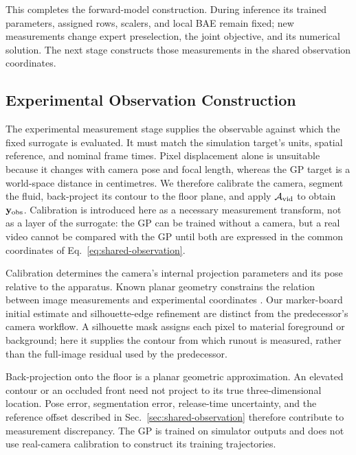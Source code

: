 This completes the forward-model construction. During inference its
trained parameters, assigned rows, scalers, and local BAE remain fixed;
new measurements change expert preselection, the joint objective, and
its numerical solution. The next stage
constructs those measurements in the shared observation coordinates.

\FloatBarrier
\subsection{Experimental Observation Construction}

\label{sec:calib}
\label{sec:obs-pipeline}


The experimental measurement stage supplies the observable against
which the fixed surrogate is evaluated. It must match the simulation
target's units, spatial reference, and nominal frame times.  Pixel displacement alone is unsuitable because it
changes with camera pose and focal length, whereas the GP target is a
world-space distance in centimetres.  We therefore calibrate the camera,
segment the fluid, back-project its contour to the floor plane, and apply
$\mathcal{A}_{\rm vid}$ to obtain $\mathbf{y}_{\rm obs}$.  Calibration is
introduced here as a necessary measurement transform, not as a layer of
the surrogate: the GP can be trained without a camera, but a real video
cannot be compared with the GP until both are expressed in the common
coordinates of Eq.~\eqref{eq:shared-observation}.


Calibration determines the camera's internal projection parameters and
its pose relative to the apparatus. Known planar geometry constrains
the relation between image measurements and experimental coordinates
\cite{zhang2000flexible}. Our marker-board initial estimate and
silhouette-edge refinement are distinct from the predecessor's camera
workflow. A silhouette mask assigns each pixel to material foreground
or background; here it supplies the contour from which runout is
measured, rather than the full-image residual used by the predecessor.

Back-projection onto the floor is a planar geometric approximation.
An elevated contour or an occluded front need not project to its true
three-dimensional location. Pose error, segmentation error,
release-time uncertainty, and the reference offset described in
Sec.~\ref{sec:shared-observation} therefore contribute to measurement
discrepancy. The GP is trained on simulator outputs and does not use
real-camera calibration to construct its training trajectories.


